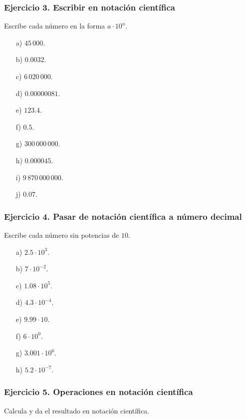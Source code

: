 \subsubsection*{Ejercicio 3. Escribir en notación científica}

Escribe cada número en la forma $a\cdot10^n$.

\begin{enumerate}
    \item[a)] $45\,000$.
    \item[b)] $0.0032$.
    \item[c)] $6\,020\,000$.
    \item[d)] $0.00000081$.
    \item[e)] $123.4$.
    \item[f)] $0.5$.
    \item[g)] $300\,000\,000$.
    \item[h)] $0.000045$.
    \item[i)] $9\,870\,000\,000$.
    \item[j)] $0.07$.
\end{enumerate}

\subsubsection*{Ejercicio 4. Pasar de notación científica a número decimal}

Escribe cada número sin potencias de $10$.

\begin{enumerate}
    \item[a)] $2.5\cdot10^3$.
    \item[b)] $7\cdot10^{-2}$.
    \item[c)] $1.08\cdot10^5$.
    \item[d)] $4.3\cdot10^{-4}$.
    \item[e)] $9.99\cdot10$.
    \item[f)] $6\cdot10^0$.
    \item[g)] $3.001\cdot10^6$.
    \item[h)] $5.2\cdot10^{-7}$.
\end{enumerate}

\subsubsection*{Ejercicio 5. Operaciones en notación científica}

Calcula y da el resultado en notación científica.

